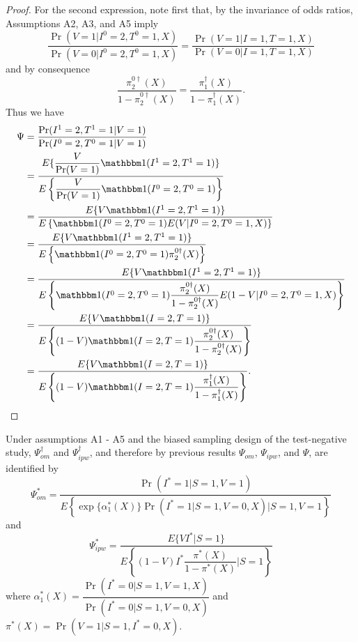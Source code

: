 \begin{appendix}
\begin{proof}
    For the second expression, note first that, by the invariance of odds ratios, Assumptions A2, A3, and A5 imply
    \begin{equation*}
        \dfrac{\Pr(V = 1 | I^0 = 2, T^0 = 1, X)}{\Pr(V = 0 | I^0 = 2,  T^0 = 1, X)} = \dfrac{\Pr(V = 1 | I = 1, T = 1, X)}{\Pr(V = 0 | I = 1,  T = 1, X)}
    \end{equation*}
    and by consequence 
    \begin{equation*}
        \dfrac{\pi^{0\dagger}_2(X)}{1 - \pi^{0\dagger}_2(X)} = \dfrac{\pi^\dagger_1(X)}{1 - \pi^\dagger_1(X)}.
    \end{equation*}
    Thus we have
    \begin{align*}
        \Psi &= \dfrac{\Pr(I^1=2, T^1 = 1|V=1)}{\Pr(I^0=2, T^0 = 1|V=1)} \\
        &= \dfrac{E\{\dfrac{V}{\Pr(V=1)} \mathbbm 1 (I^1 = 2, T^1 = 1)\}}{E\left\{\dfrac{V}{\Pr(V=1)}\mathbbm 1 (I^0 = 2, T^0 = 1)\right\}} \\
        &= \dfrac{E\{V \mathbbm 1 (I^1 = 2, T^1 = 1)\}}{E\left\{\mathbbm 1 (I^0 = 2, T^0 = 1) E(V | I^0 = 2, T^0 = 1, X)\right\}} \\
        &= \dfrac{E\{V \mathbbm 1 (I^1 = 2, T^1 = 1)\}}{E\left\{\mathbbm 1 (I^0 = 2, T^0 = 1) \pi^{0\dagger}_2(X)\right\}} \\
        &= \dfrac{E\{V \mathbbm 1 (I^1 = 2, T^1 = 1)\}}{E\left\{\mathbbm 1 (I^0 = 2, T^0 = 1) \dfrac{\pi^{0\dagger}_2(X)}{1-\pi^{0\dagger}_2(X)}E(1-V |I^0 = 2, T^0 = 1, X)\right\}} \\
        &= \dfrac{E\{V \mathbbm 1 (I = 2, T = 1)\}}{E\left\{(1 - V)\mathbbm 1 (I = 2, T = 1) \dfrac{\pi^{0\dagger}_2(X)}{1-\pi^{0\dagger}_2(X)}\right\}} \\
        &= \dfrac{E\{V \mathbbm 1 (I = 2, T = 1)\}}{E\left\{(1 - V)\mathbbm 1 (I = 2, T = 1) \dfrac{\pi^\dagger_1(X)}{1-\pi^\dagger_1(X)}\right\}}.
    \end{align*}
    \end{proof}
    \newpage 
    \begin{corollary}\label{corollary2}
    Under assumptions A1 - A5 and the biased sampling design of the test-negative study, $\Psi^\dagger_{om}$ and $\Psi^\dagger_{ipw}$, and therefore by previous results $\Psi_{om}$, $\Psi_{ipw}$, and $\Psi$, are identified by
    \begin{equation}
        \Psi_{om}^* = \dfrac{\Pr(I^* = 1 | S = 1, V = 1)}{E\left\{ \exp\{\alpha^*_1(X)\} \Pr(I^* = 1 | S = 1, V = 0, X) \Big| S = 1, V = 1 \right\}}
    \end{equation}
    and 
    \begin{equation}
        \Psi_{ipw}^* = \dfrac{E\{VI^*|S =1\}}{E\left\{ (1 - V) I^* \dfrac{\pi^*(X)}{1 - \pi^*(X)} \bigg| S = 1\right\}}
    \end{equation}
    where $\alpha^*_1(X) = \dfrac{\Pr(I^* = 0 | S = 1, V = 1, X)}{\Pr(I^* = 0| S = 1, V = 0, X)}$ and $\pi^*(X) = \Pr(V = 1| S = 1, I^* = 0, X)$.
    \end{corollary}
    

\end{appendix}
